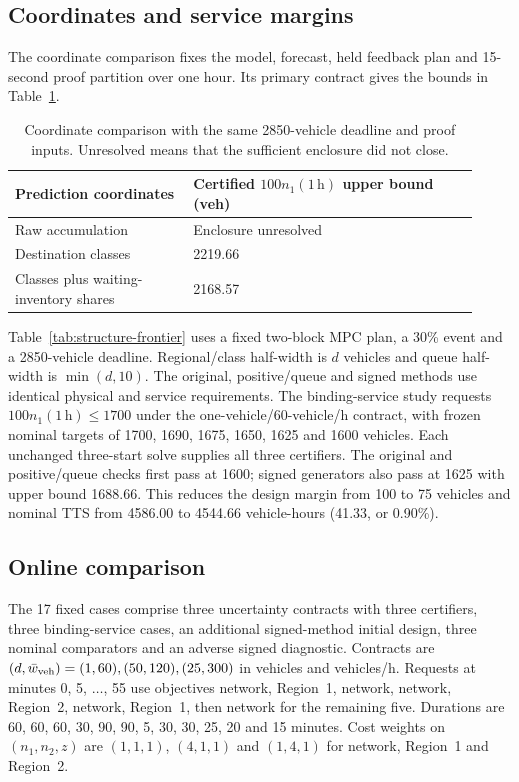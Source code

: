 \subsection{Coordinates and service margins}
The coordinate comparison fixes the model, forecast, held feedback plan
and 15-second proof partition over one hour. Its primary contract gives
the bounds in Table~\ref{tab:new-coordinate-ablation}.
\begin{table}[t]
\centering\small
\caption{Coordinate comparison with the same 2850-vehicle deadline and
proof inputs. Unresolved means that the sufficient enclosure did not close.}
\label{tab:new-coordinate-ablation}
\begin{tabular}{@{}p{0.35\linewidth}p{0.57\linewidth}@{}}
\toprule
Prediction coordinates & Certified $100n_1(1\,\mathrm h)$ upper bound (veh)\\
\midrule
Raw accumulation & Enclosure unresolved\\
Destination classes & 2219.66\\
Classes plus waiting-inventory shares & 2168.57\\
\bottomrule
\end{tabular}
\end{table}

Table~\ref{tab:structure-frontier} uses a fixed two-block MPC plan, a 30\%
event and a 2850-vehicle deadline. Regional/class half-width is $d$ vehicles
and queue half-width is $\min(d,10)$. The original, positive/queue and
signed methods use identical physical and service requirements. The
binding-service study requests $100n_1(1\,\mathrm h)\le1700$ under the
one-vehicle/60-vehicle/h contract, with frozen nominal targets of 1700,
1690, 1675, 1650, 1625 and 1600 vehicles. Each unchanged three-start solve
supplies all three certifiers. The original and positive/queue checks first
pass at 1600; signed generators also pass at 1625 with upper bound 1688.66.
This reduces the design margin from 100 to 75 vehicles and nominal TTS
from 4586.00 to 4544.66 vehicle-hours (41.33, or 0.90\%).

\subsection{Online comparison}
The 17 fixed cases comprise three uncertainty contracts with three
certifiers, three binding-service cases, an additional signed-method
initial design, three nominal comparators and an adverse signed diagnostic.
Contracts are $(d,\bar w_{\rm veh})=(1,60),(50,120),(25,300)$ in vehicles
and vehicles/h. Requests at minutes 0, 5, $\ldots$, 55 use objectives
network, Region~1, network, network, Region~2, network, Region~1, then
network for the remaining five. Durations are 60, 60, 60, 30, 90, 90, 5,
30, 30, 25, 20 and 15 minutes. Cost weights on $(n_1,n_2,z)$ are
$(1,1,1)$, $(4,1,1)$ and $(1,4,1)$ for network, Region~1 and Region~2.

